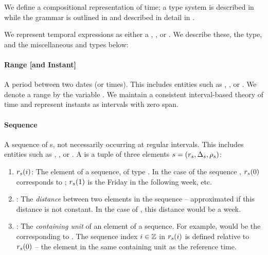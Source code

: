 We define a compositional representation of time; a type system 
	is described in  while the grammar is outlined in
	 and described in detail in 
	.

We represent temporal expressions as either a , ,
	or .
We describe these, the  type, and the miscellaneous
	 and  types below:
\paragraph{Range [and Instant]}
A period between two dates (or times).
This includes entities such as , , or
	.
We denote a range by the variable \range.
We maintain a consistent interval-based theory of time
	\cite{key:1981allen-temporal} and represent instants as intervals with
	zero span.

\paragraph{Sequence}
A sequence of s, not necessarily occurring at regular intervals.
This includes entities such as , , or
	.
A  is a tuple of three elements
	$s=(r_s,\Delta_s,\rho_s)$:
\begin{enumerate}
	\setlength{\itemsep}{-5pt} 
	\item $r_s(i)$: 
		The  element of a sequence, of type .
		In the case of the sequence , $r_s(0)$ corresponds to
			; 
			$r_s(1)$ is the Friday in the following week, etc.
	\item \seqjump:
		The \textit{distance} between two elements in the sequence -- approximated
			if this distance is not constant.
		In the case of , this distance would be a week.
	\item \seqcanon:
		The \textit{containing unit} of an element of a sequence.
		For example,  would be the 
			corresponding to .
		The sequence index $i \in \mathbb{Z}$ in $r_s(i)$ is defined relative to $r_s(0)$ --
			the element in the same containing unit as the reference time.
\end{enumerate}

